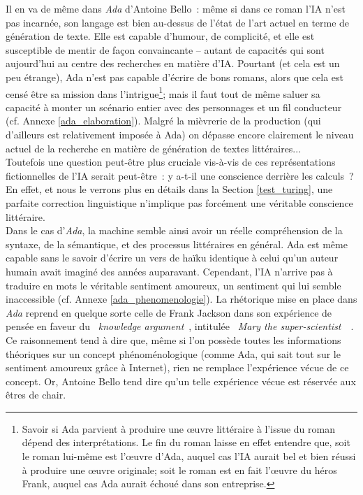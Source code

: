 \documentclass{article}
\begin{document}
					Il en va de même dans \textit{Ada} d'Antoine Bello~: même si dans ce roman l'IA n'est pas incarnée, son langage est bien au-dessus de l'état de l'art actuel en terme de génération de texte. Elle est capable d'humour, de complicité, et elle est susceptible de mentir de façon convaincante -- autant de capacités qui sont aujourd’hui au centre des recherches en matière d'IA. Pourtant (et cela est un peu étrange), Ada n'est pas capable d'écrire de bons romans, alors que cela est censé être sa mission dans l'intrigue\footnote{Savoir si Ada parvient à produire une œuvre littéraire à l'issue du roman dépend des interprétations. Le fin du roman laisse en effet entendre que, soit le roman lui-même est l'œuvre d'Ada, auquel cas l'IA aurait bel et bien réussi à produire une œuvre originale; soit le roman est en fait l'œuvre du héros Frank, auquel cas Ada aurait échoué dans son entreprise.}; mais il faut tout de même saluer sa capacité à monter un scénario entier avec des personnages et un fil conducteur (cf. Annexe \ref{ada_elaboration}). Malgré la mièvrerie de la production (qui d'ailleurs est relativement imposée à Ada) on dépasse encore clairement le niveau actuel de la recherche en matière de génération de textes littéraires...\\
					
					Toutefois une question peut-être plus cruciale vis-à-vis de ces représentations fictionnelles de l'IA serait peut-être~: y a-t-il une conscience derrière les calculs~? En effet, et nous le verrons plus en détails dans la Section \ref{test_turing}, une parfaite correction linguistique n'implique pas forcément une véritable conscience littéraire.\\
					
					Dans le cas d'\textit{Ada}, la machine semble ainsi avoir un réelle compréhension de la syntaxe, de la sémantique, et des processus littéraires en général. Ada est même capable sans le savoir d'écrire un vers de haïku identique à celui qu'un auteur humain avait imaginé des années auparavant. Cependant, l'IA n'arrive pas à traduire en mots le véritable sentiment amoureux, un sentiment qui lui semble inaccessible (cf. Annexe \ref{ada_phenomenologie}). La rhétorique mise en place dans \textit{Ada} reprend en quelque sorte celle de Frank Jackson dans son expérience de pensée en faveur du \guillemotleft~\textit{knowledge argument}~\guillemotright, intitulée \guillemotleft~\textit{Mary the super-scientist}~\guillemotright~\autocite{jackson1982}. Ce raisonnement tend à dire que, même si l'on possède toutes les informations théoriques sur un concept phénoménologique (comme Ada, qui sait tout sur le sentiment amoureux grâce à Internet), rien ne remplace l'expérience vécue de ce concept. Or, Antoine Bello tend dire qu'un telle expérience vécue est réservée aux êtres de chair.\\
					
\end{document}
